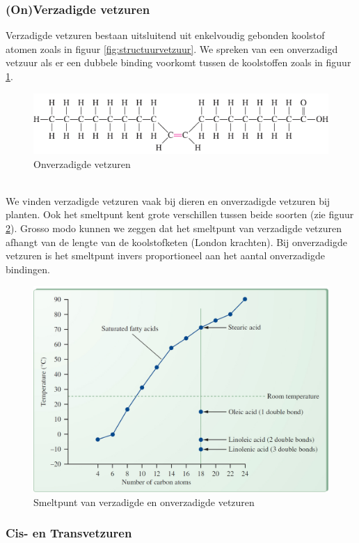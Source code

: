 \documentclass[a4paper,kul]{kulakarticle} %
\begin{document}
\subsubsection{(On)Verzadigde vetzuren}
Verzadigde vetzuren bestaan uitsluitend uit enkelvoudig gebonden koolstof atomen zoals in figuur \ref{fig:structuurvetzuur}. We spreken van een onverzadigd vetzuur als er een dubbele binding voorkomt tussen de koolstoffen zoals in figuur \ref{fig:onverzadigdevetzuren}.
\begin{figure}[h]
	\centering
	\includegraphics[width=0.7\linewidth]{OnVerzadigdeVetzuren}
	\caption[Onverzadigde VZ]{Onverzadigde vetzuren}
	\label{fig:onverzadigdevetzuren}
\end{figure}\\
We vinden verzadigde vetzuren vaak bij dieren en onverzadigde vetzuren bij planten. Ook het smeltpunt kent grote verschillen tussen beide soorten (zie figuur \ref{fig:smeltpuntvetzuren}). Grosso modo kunnen we zeggen dat het smeltpunt van verzadigde vetzuren afhangt van de lengte van de koolstofketen (London krachten). Bij onverzadigde vetzuren is het smeltpunt invers proportioneel aan het aantal onverzadigde bindingen. 
\begin{figure}[h]
	\centering
	\includegraphics[width=0.7\linewidth]{smeltpuntVetzuren}
	\caption[Smeltpunt]{Smeltpunt van verzadigde en onverzadigde vetzuren}
	\label{fig:smeltpuntvetzuren}
\end{figure}


\subsubsection{Cis- en Transvetzuren}
\end{document}
